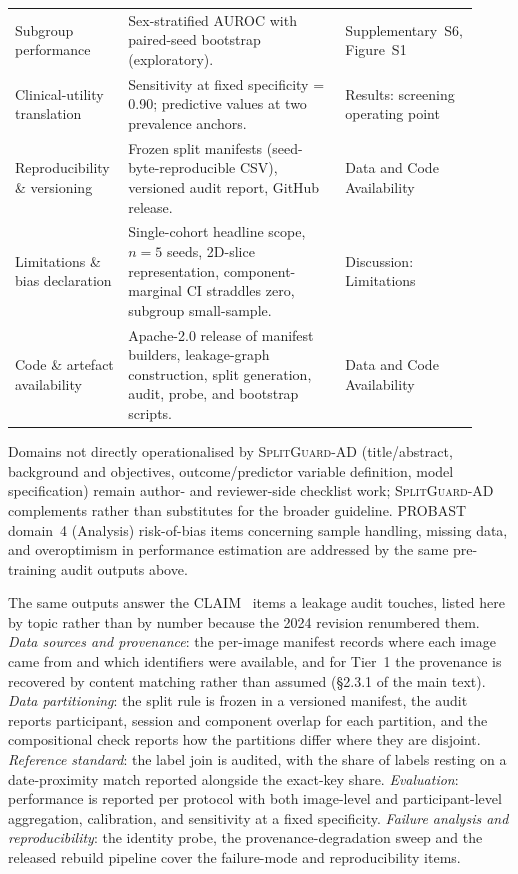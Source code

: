 \documentclass[11pt]{article}
\newcommand{\SGA}{\textsc{SplitGuard-AD}}
\begin{document}
\begin{table}[!ht]
\begin{tabular}{p{0.24\linewidth}p{0.46\linewidth}p{0.22\linewidth}}
Subgroup performance & Sex-stratified AUROC with paired-seed bootstrap (exploratory). & Supplementary~S6, Figure~S1 \\
Clinical-utility translation & Sensitivity at fixed specificity = 0.90; predictive values at two prevalence anchors. & Results: screening operating point \\
Reproducibility \& versioning & Frozen split manifests (seed-byte-reproducible CSV), versioned audit report, GitHub release. & Data and Code Availability \\
Limitations \& bias declaration & Single-cohort headline scope, $n=5$ seeds, 2D-slice representation, component-marginal CI straddles zero, subgroup small-sample. & Discussion: Limitations \\
Code \& artefact availability & Apache-2.0 release of manifest builders, leakage-graph construction, split generation, audit, probe, and bootstrap scripts. & Data and Code Availability \\
\bottomrule
\end{tabular}
\end{table}

Domains not directly operationalised by \SGA{} (title/abstract,
background and objectives, outcome/predictor variable definition,
model specification) remain author- and reviewer-side checklist
work; \SGA{} complements rather than substitutes for the broader
guideline. PROBAST domain~4 (Analysis) risk-of-bias items concerning
sample handling, missing data, and overoptimism in performance
estimation are addressed by the same pre-training audit outputs
above.

The same outputs answer the CLAIM~\cite{claim2024,mongan2020claim}
items a leakage audit touches, listed here by topic rather than by
number because the 2024 revision renumbered them. \emph{Data
sources and provenance}: the per-image manifest records where each
image came from and which identifiers were available, and for Tier~1
the provenance is recovered by content matching rather than assumed
(\S2.3.1 of the main text). \emph{Data partitioning}: the split rule
is frozen in a versioned manifest, the audit reports participant,
session and component overlap for each partition, and the
compositional check reports how the partitions differ where they are
disjoint. \emph{Reference standard}: the label join is audited, with
the share of labels resting on a date-proximity match reported
alongside the exact-key share. \emph{Evaluation}: performance is
reported per protocol with both image-level and participant-level
aggregation, calibration, and sensitivity at a fixed specificity.
\emph{Failure analysis and reproducibility}: the identity probe, the
provenance-degradation sweep and the released rebuild pipeline cover
the failure-mode and reproducibility items.
\end{document}

